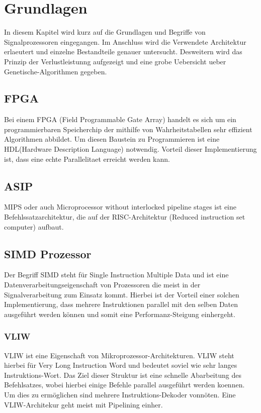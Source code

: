 \chapter{Grundlagen}
\label{chap:grundlagen}
In diesem Kapitel wird kurz auf die Grundlagen und Begriffe von Signalprozessoren eingegangen. Im Anschluss wird die Verwendete Architektur erlaeutert und einzelne Bestandteile genauer untersucht. Desweitern wird das Prinzip der Verlustleistunng aufgezeigt und eine grobe Uebersicht ueber Genetische-Algorithmen gegeben.

\section{FPGA}
Bei einem FPGA (Field Programmable Gate Array) handelt es sich um ein programmierbaren Speicherchip der mithilfe von Wahrheitstabellen sehr effizient Algorithmen abbildet. Um diesen Baustein zu Programmieren ist eine HDL(Hardware Description Language) notwendig. Vorteil dieser Implementierung ist, dass eine echte Parallelitaet erreicht werden kann.

\section{ASIP}

MIPS oder auch \glqq Microprocessor without interlocked pipeline stages\grqq{} ist eine Befehlssatzarchitektur, die auf der RISC-Architektur  (Reduced instruction set computer) aufbaut.

\section{SIMD Prozessor}
\label{sec:VLIW}
Der Begriff SIMD steht für Single Instruction Multiple Data und ist eine Datenverarbeitungseigenschaft von Prozessoren die meist in der Signalverarbeitung zum Einsatz kommt. Hierbei ist der Vorteil einer solchen Implementierung, dass mehrere Instruktionen parallel mit den selben Daten ausgeführt werden können und somit eine Performanz-Steigung einhergeht.

\subsection{VLIW}
VLIW ist eine Eigenschaft von Mikroprozessor-Architekturen. VLIW steht hierbei für Very Long Instruction Word und bedeutet soviel wie sehr langes Instruktions-Wort. Das Ziel dieser Struktur ist eine schnelle Abarbeitung des Befehlsatzes, wobei hierbei einige Befehle parallel ausgeführt werden koennen. Um dies zu ermöglichen sind mehrere Instruktions-Dekoder vonnöten. Eine VLIW-Architekur geht meist mit Pipelining einher. 
